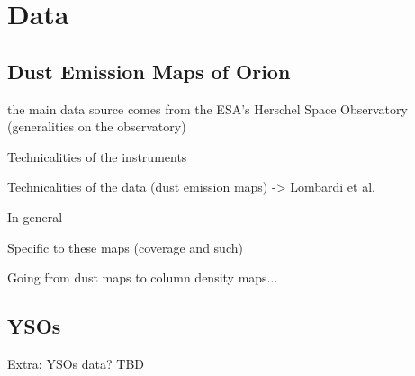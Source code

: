 \chapter{Data}
\label{chap:data}

\section{Dust Emission Maps of Orion}
the main data source comes from the ESA's Herschel Space Observatory (generalities on the observatory)

Technicalities of the instruments

Technicalities of the data (dust emission maps) -> Lombardi et al.

In general

Specific to these maps (coverage and such)

Going from dust maps to column density maps...

\section{YSOs}
Extra: YSOs data? TBD

